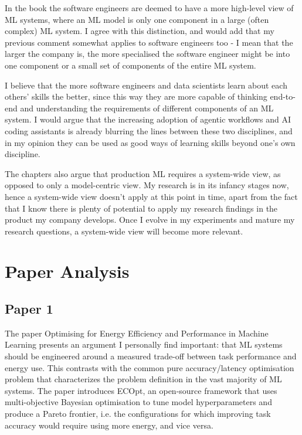 \documentclass[11pt]{article}
\begin{document}
In the book the software engineers are deemed to have a more high-level view of ML systems, where an ML model is only one component in a large (often complex) ML system. I agree with this distinction, and would add that my previous comment somewhat applies to software engineers too - I mean that the larger the company is, the more specialised the software engineer might be into one component or a small set of components of the entire ML system.

I believe that the more software engineers and data scientists learn about each others' skills the better, since this way they are more capable of thinking end-to-end and understanding the requirements of different components of an ML system. I would argue that the increasing adoption of agentic workflows and AI coding assistants is already blurring the lines between these two disciplines, and in my opinion they can be used as good ways of learning skills beyond one's own discipline.

The chapters also argue that production ML requires a system-wide view, as opposed to only a model-centric view. My research is in its infancy stages now, hence a system-wide view doesn't apply at this point in time, apart from the fact that I know there is plenty of potential to apply my research findings in the product my company develops. Once I evolve in my experiments and mature my research questions, a system-wide view will become more relevant.

\section{Paper Analysis} \label{ch:papers}

\subsection{Paper 1} \label{ch:paper1}

The paper Optimising for Energy Efficiency and Performance in Machine Learning \citep{paper1} presents an argument I personally find important: that ML systems should be engineered around a measured trade-off between task performance and energy use. This contrasts with the common pure accuracy/latency optimisation problem that characterizes the problem definition in the vast majority of ML systems. The paper introduces ECOpt, an open-source framework that uses multi-objective Bayesian optimisation to tune model hyperparameters and produce a Pareto frontier, i.e. the configurations for which improving task accuracy would require using more energy, and vice versa.
\end{document}
